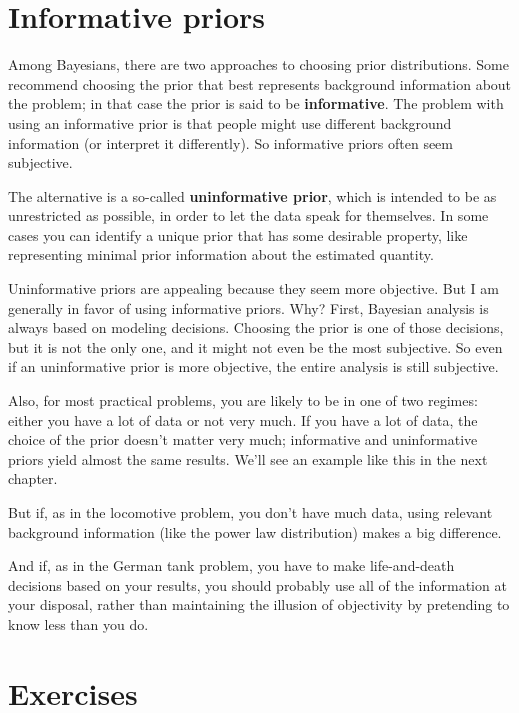 \documentclass[12pt]{book}
\theoremstyle{exercise}
\begin{document}
\section{Informative priors}

Among Bayesians, there are two approaches to choosing prior
distributions.  Some recommend choosing the prior that best represents
background information about the problem; in that case the prior
is said to be {\bf informative}.  The problem with using an informative
prior is that people might use different background information (or
interpret it differently).  So informative priors often seem subjective.

The alternative is a so-called {\bf uninformative prior}, which is
intended to be as unrestricted as possible, in order to let the data
speak for themselves.  In some cases you can identify a unique prior
that has some desirable property, like representing minimal prior
information about the estimated quantity.

Uninformative priors are appealing because they seem more
objective.  But I am generally in favor of using informative priors.
Why?  First, Bayesian analysis is always based on
modeling decisions.  Choosing the prior is one of those decisions, but
it is not the only one, and it might not even be the most subjective.
So even if an uninformative prior is more objective, the entire analysis
is still subjective.


Also, for most practical problems, you are likely to be in one of two
regimes: either you have a lot of data or not very much.  If you have
a lot of data, the choice of the prior doesn't matter very much;
informative and uninformative priors yield almost the same results.
We'll see an example like this in the next chapter.

But if, as in the locomotive problem, you don't have much data,
using relevant background information (like the power law distribution)
makes a big difference.

And if, as in the German tank problem, you have to make life-and-death
decisions based on your results, you should probably use all of the
information at your disposal, rather than maintaining the illusion of
objectivity by pretending to know less than you do.


\section{Exercises}
\end{document}
